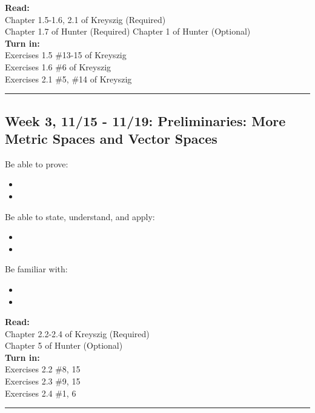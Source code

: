 \documentclass[course=Introduction\ to\ Functional\ Analysis, semester=Fall\ 2021]{syllabustemplate}
\begin{document}
{\textbf{Read:}\\
Chapter 1.5-1.6, 2.1 of Kreyszig (Required)\\
Chapter 1.7 of Hunter (Required)
Chapter 1 of Hunter (Optional)\\

\textbf{Turn in:}\\
Exercises 1.5 \#13-15 of Kreyszig\\
Exercises 1.6 \#6 of Kreyszig\\
Exercises 2.1 \#5, \#14 of Kreyszig\\
\hrule
\subsection{Week 3, 11/15 - 11/19: Preliminaries: More Metric Spaces and Vector Spaces}
\label{sub:week_2_11_3_11_10_preliminaries_more_metric_spaces_and_vector_spaces}


Be able to prove:
\begin{itemize}
	\item 
	\item 
\end{itemize}

Be able to state, understand, and apply:
\begin{itemize}
	\item 
	\item 
\end{itemize}

Be familiar with:
\begin{itemize}
	\item 
	\item 
\end{itemize}
\vspace{1em}

\textbf{Read:}\\
Chapter 2.2-2.4 of Kreyszig (Required)\\
Chapter 5 of Hunter (Optional)\\

\textbf{Turn in:}\\
Exercises 2.2 \#8, 15\\
Exercises 2.3 \#9, 15\\
Exercises 2.4 \#1, 6\\
\hrule
}


\end{document}
